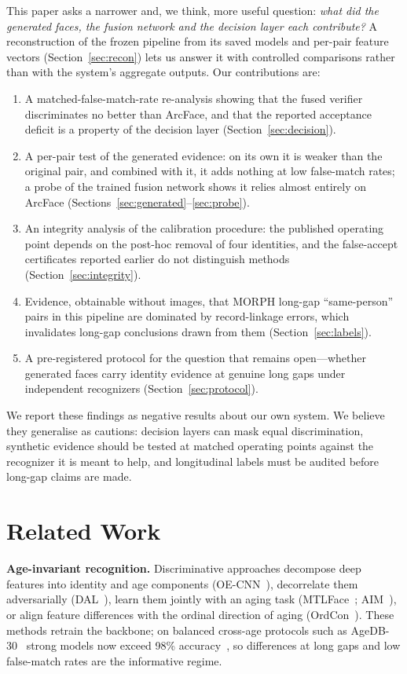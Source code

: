 \documentclass[journal]{IEEEtran}
\begin{document}
This paper asks a narrower and, we think, more useful question: \emph{what did the generated faces, the fusion network and the decision layer each contribute?} A reconstruction of the frozen pipeline from its saved models and per-pair feature vectors (Section~\ref{sec:recon}) lets us answer it with controlled comparisons rather than with the system's aggregate outputs. Our contributions are:
\begin{enumerate}
\item A matched-false-match-rate re-analysis showing that the fused verifier discriminates no better than ArcFace, and that the reported acceptance deficit is a property of the decision layer (Section~\ref{sec:decision}).
\item A per-pair test of the generated evidence: on its own it is weaker than the original pair, and combined with it, it adds nothing at low false-match rates; a probe of the trained fusion network shows it relies almost entirely on ArcFace (Sections~\ref{sec:generated}--\ref{sec:probe}).
\item An integrity analysis of the calibration procedure: the published operating point depends on the post-hoc removal of four identities, and the false-accept certificates reported earlier do not distinguish methods (Section~\ref{sec:integrity}).
\item Evidence, obtainable without images, that MORPH long-gap ``same-person'' pairs in this pipeline are dominated by record-linkage errors, which invalidates long-gap conclusions drawn from them (Section~\ref{sec:labels}).
\item A pre-registered protocol for the question that remains open---whether generated faces carry identity evidence at genuine long gaps under independent recognizers (Section~\ref{sec:protocol}).
\end{enumerate}
We report these findings as negative results about our own system. We believe they generalise as cautions: decision layers can mask equal discrimination, synthetic evidence should be tested at matched operating points against the recognizer it is meant to help, and longitudinal labels must be audited before long-gap claims are made.

\section{Related Work}
\textbf{Age-invariant recognition.} Discriminative approaches decompose deep features into identity and age components (OE-CNN~\cite{wang2018oecnn}), decorrelate them adversarially (DAL~\cite{wang2019dal}), learn them jointly with an aging task (MTLFace~\cite{huang2021mtlface}; AIM~\cite{zhao2022aim}), or align feature differences with the ordinal direction of aging (OrdCon~\cite{wang2025ordcon}). These methods retrain the backbone; on balanced cross-age protocols such as AgeDB-30~\cite{moschoglou2017agedb} strong models now exceed 98\% accuracy~\cite{dahan2023wasserstein}, so differences at long gaps and low false-match rates are the informative regime.
\end{document}
